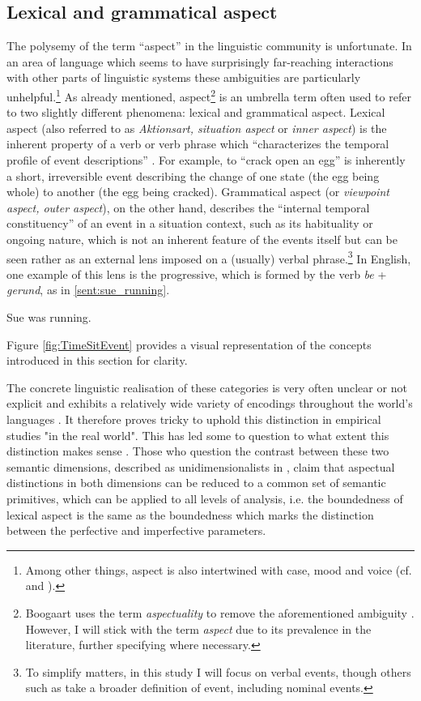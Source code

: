 \subsection{Lexical and grammatical aspect}
The polysemy of the term “aspect” in the linguistic community is unfortunate. In an area of language which seems to have surprisingly far-reaching interactions with other parts of linguistic systems these ambiguities are particularly unhelpful.\footnote{Among other things, aspect is also intertwined with case, mood and voice (cf. \citet{franks2005slavic} and \citet{Kiparsky2004PartitiveCA}).}
As already mentioned, aspect\footnote{Boogaart uses the term \emph{aspectuality} to remove the aforementioned ambiguity \citep{Boogaart+2004+1165+1180}. However, I will stick with the term \emph{aspect} due to its prevalence in the literature, further specifying where necessary.} is an umbrella term often used to refer to two slightly different phenomena: lexical and grammatical aspect. Lexical aspect (also referred to as \emph{Aktionsart, situation aspect} or \emph{inner aspect}) is the inherent property of a verb or verb phrase which “characterizes the temporal profile of event descriptions” \citep{10.1093/oxfordhb/9780199601264.013.25}. For example, to “crack open an egg” is inherently a short, irreversible event describing the change of one state (the egg being whole) to another (the egg being cracked). Grammatical aspect (or \emph{viewpoint aspect, outer aspect}), on the other hand, describes the “internal temporal constituency” \citep{comrie1976aspect} of an event in a situation context, such as its habituality or ongoing nature, which is not an inherent feature of the events itself but can be seen rather as an external lens imposed on a (usually) verbal phrase.\footnote{To simplify matters, in this study I will focus on verbal events, though others such as \citet{umr} take a broader definition of event, including nominal events.} In English, one example of this lens is the progressive, which is formed by the verb \emph{be} + \emph{gerund}, as in \ref{sent:sue_running}.

\begin{exe}
    \ex Sue was running.
    \label{sent:sue_running}
\end{exe}
Figure \ref{fig:TimeSitEvent} provides a visual representation of the concepts introduced in this section for clarity. 

The concrete linguistic realisation of these categories is very often unclear or not explicit and exhibits a relatively wide variety of encodings throughout the world’s languages \citep{Dahl1985TenseAA}. It therefore proves tricky to uphold this distinction in empirical studies "in the real world". This has led some to question to what extent this distinction makes sense \citep{Sasse2002RecentAI}. Those who question the contrast between these two semantic dimensions, described as unidimensionalists in \citet{Sasse2002RecentAI}, claim that aspectual distinctions in both dimensions can be reduced to a common set of semantic primitives, which can be applied to all levels of analysis, i.e. the boundedness of lexical aspect is the same as the boundedness which marks the distinction between the perfective and imperfective parameters. 

